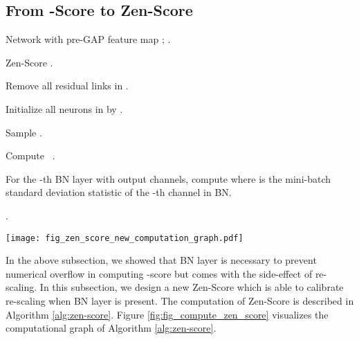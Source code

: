 \documentclass{article}
\begin{document}
\subsection{From -Score to Zen-Score}

\begin{algorithm}[!]
  \caption{Zen-Score}
  \label{alg:zen-score}
\begin{algorithmic}[1]

\REQUIRE Network  with pre-GAP feature map ; .

\ENSURE Zen-Score .

\STATE Remove all residual links in .

\STATE Initialize all neurons in  by .

\STATE Sample .

\STATE Compute  \, .

\STATE For the -th BN layer with  output channels, compute  where  is the mini-batch standard deviation statistic of the -th channel in BN.

\STATE .

\end{algorithmic}
\end{algorithm}

\begin{figure*}[!]
  \begin{center}
    \texttt{[image: fig\_zen\_score\_new\_computation\_graph.pdf]}  
  \end{center}
\caption{Zen-Score computational graph.  is one mini-batch of input images. For each BN layer, we extract its mini-batch deviation parameter .  is the differential of pre-GAP feature map  with respect to .}
\label{fig:fig_compute_zen_score}
\end{figure*}

In the above subsection, we showed that BN layer is necessary to prevent numerical overflow in computing -score but comes with the side-effect of re-scaling. In this subsection, we design a new Zen-Score which is able to calibrate re-scaling when BN layer is present. The computation  of Zen-Score is described in Algorithm \ref{alg:zen-score}. Figure \ref{fig:fig_compute_zen_score} visualizes the computational graph of Algorithm \ref{alg:zen-score}.
\end{document}
